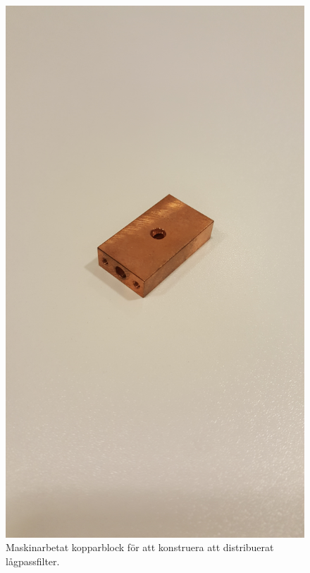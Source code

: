 \documentclass[main.tex]{subfiles}
\begin{document}
\begin{figure}
    \centering
    \includegraphics[angle=-90,trim=1550 200 1650 200,clip,width=0.975\linewidth]{figure/Filterbilder/filterbox.jpg}
    \caption{Maskinarbetat kopparblock för att konstruera att distribuerat lågpassfilter.}
    \label{fig:filterbox}
\end{figure}
\end{document}
